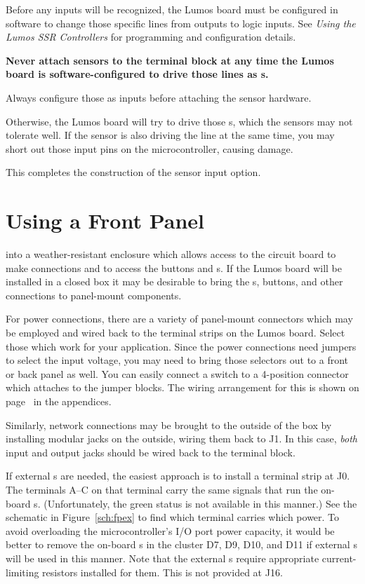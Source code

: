 \documentclass[letterpaper,twoside,onecolumn,openright,final]{memoir}
\begin{document}
\begin{description}
\item[\HandRight\ Note:] Before any inputs will be recognized, the Lumos board must be configured
in software to change those specific lines from  outputs to logic inputs.  See
\emph{Using the Lumos SSR Controllers} for programming and configuration details.
{\bfseries Never attach sensors to the terminal block at any time the Lumos board is software-configur\-ed
to drive those lines as s.  
\item[\HandRight\ Note:] Always configure those as inputs before attaching the
sensor hardware.} Otherwise, the Lumos board will try to drive those s, which the
sensors may not tolerate well. If the sensor is also driving the line at the same time, you may
short out those input pins on the microcontroller, causing damage.
\end{description}

This completes the construction of the sensor input option.

\chapter{Using a Front Panel}\label{ch:fp}
 into a weather-resistant enclosure which allows access
to the circuit board to make connections and to access the buttons and s.  If the Lumos
board will be installed in a closed box it may be desirable to bring the s, buttons,
and other connections to panel-mount components.

For power connections, there are a variety of panel-mount connectors which may be employed and wired
back to the terminal strips on the Lumos board.  Select those which work for your application.
Since the power connections need jumpers to select the input voltage, you may need to bring those
selectors out to a front or back panel as well.  You can easily connect a  switch
to a 4-position connector which attaches to the jumper blocks.  The wiring arrangement for this 
is shown on page~\pageref{sec:voltagesw} in the appendices.

Similarly, network connections may be brought to the outside of the box by installing modular jacks
on the outside, wiring them back to J1.  In this case, \emph{both} input and output jacks should be wired
back to the terminal block.

If external s are needed, the easiest approach is to install a terminal strip at J0.
The terminals A--C on that terminal carry the same signals that run the on-board s.
(Unfortunately, the green status  is not available in this manner.)
See the schematic in Figure~\ref{sch:fpex}
to find which terminal carries which  power.
To avoid overloading the microcontroller's I/O port power capacity, it would be better to remove the
on-board s in the cluster D7, D9, D10, and D11 if external s will be used
in this manner.  Note that the external s require appropriate current-limiting resistors
installed for them.  This is not provided at J16.
\end{document}
